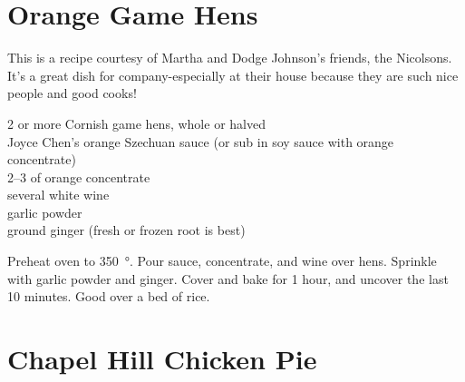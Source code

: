 \section{Orange Game Hens}

\begin{open}
  This is a recipe courtesy of Martha and Dodge Johnson's friends, the Nicolsons. It's a great dish for company-especially at their house because they are such nice people and good cooks!
\end{open}
\begin{ingredients}
  2 or more Cornish game hens, whole or halved\\
  Joyce Chen's orange Szechuan sauce (or sub in soy sauce with orange
  concentrate)\\
  \SIrange{2}{3}{\tblspoon} of orange concentrate\\
  several \si{\tblspoon} white wine\\
  garlic powder\\
  ground ginger (fresh or frozen root is best)
\end{ingredients}
Preheat oven to \SI{350}{\degree}. Pour sauce, concentrate, and wine over
hens. Sprinkle with garlic powder and ginger. Cover and bake for
1 hour, and uncover the last 10 minutes. Good over a bed of rice.

\section{Chapel Hill Chicken Pie}

